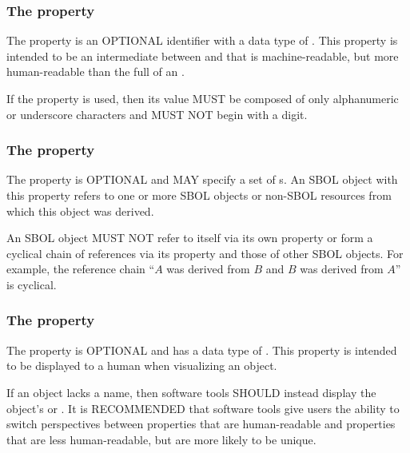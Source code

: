 \subsubsection*{The  property}
\label{sec:displayId}
The  property is an OPTIONAL identifier with a data type of . This property is intended to be an intermediate between  and  that is machine-readable, but more human-readable than the full  of an .

If the  property is used, then its  value MUST be composed of only alphanumeric or underscore characters and MUST NOT begin with a digit.


\subsubsection*{The  property}
\label{sec:wasDerivedFroms}


The  property is OPTIONAL and MAY specify a set of s. An SBOL object with this property refers to one or more SBOL objects or non-SBOL resources from which this object was derived.

An SBOL object MUST NOT refer to itself via its own  property or form a cyclical chain of references via its  property and those of other SBOL objects. For example, the reference chain ``$A$ was derived from $B$ and $B$ was derived from $A$'' is cyclical.


\subsubsection*{The  property}
\label{sec:name}

The  property is OPTIONAL and has a data type of . This property is intended to be displayed to a human when visualizing an  object.

If an  object lacks a name, then software tools SHOULD instead display the object's  or .
It is RECOMMENDED that software tools give users the ability to switch perspectives between  properties that are human-readable and  properties that are less human-readable, but are more likely to be unique.

